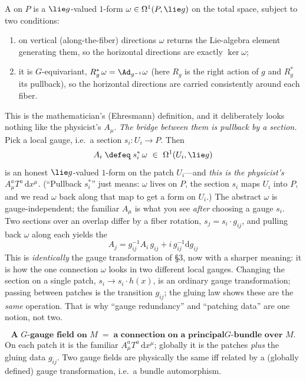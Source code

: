 \documentclass[11pt]{article}
\newcommand{\dd}{\mathrm{d}}                 %
\begin{document}
\begin{ddefinition}
A  on $P$ is a $\lie g$-valued $1$-form $\omega\in\Omega^1(P,\lie g)$ on
the total space, subject to two conditions:
\begin{enumerate}[label=(\roman*)]
\item on vertical (along-the-fiber) directions $\omega$ returns the Lie-algebra element
generating them, so the horizontal directions are exactly $\ker\omega$;
\item it is $G$-equivariant, $R_g^*\,\omega=\Ad_{g^{-1}}\omega$ (here $R_g$ is the right
action of $g$ and $R_g^*$ its pullback), so the horizontal directions are carried
consistently around each fiber.
\end{enumerate}
\end{ddefinition}

This is the mathematician's (Ehresmann) definition, and it deliberately looks nothing like
the physicist's $A_\mu$. \emph{The bridge between them is pullback by a section.} Pick a
local gauge, i.e.\ a section $s_i:U_i\to P$. Then
\[
A_i\;\defeq\;s_i^{*}\,\omega\ \in\ \Omega^1(U_i,\lie g)
\]
is an honest $\lie g$-valued $1$-form on the patch $U_i$---and \emph{this is the
physicist's $A_\mu^a T^a\,\dd x^\mu$.} (``Pullback $s_i^*$'' just means: $\omega$ lives on
$P$, the section $s_i$ maps $U_i$ into $P$, and we read $\omega$ back along that map to get
a form on $U_i$.) The abstract $\omega$ is gauge-independent; the familiar $A_\mu$ is what
you see \emph{after} choosing a gauge $s_i$. Two sections over an overlap differ by a
fiber rotation, $s_j=s_i\cdot g_{ij}$, and pulling back $\omega$ along each yields the
\[
\boxed{\;A_j=g_{ij}^{-1}A_i\,g_{ij}+i\,g_{ij}^{-1}\dd g_{ij}\;}
\]
This is \emph{identically} the gauge transformation of \S3, now with a sharper meaning: it
is how the one connection $\omega$ looks in two different local gauges. Changing the
section on a single patch, $s_i\to s_i\cdot h(x)$, is an ordinary gauge transformation;
passing between patches is the transition $g_{ij}$; the gluing law shows these are the
\emph{same} operation. That is why ``gauge redundancy'' and ``patching data'' are one
notion, not two.

\begin{eequation}
\[
\textbf{A $G$-gauge field on $M$} \;=\; \textbf{a connection on a principal
$G$-bundle over $M$.}
\]
On each patch it is the familiar $A_\mu^a T^a\,\dd x^\mu$; globally it is the patches
\emph{plus} the gluing data $g_{ij}$. Two gauge fields are physically the same iff
related by a (globally defined) gauge transformation, i.e.\ a bundle automorphism.
\end{eequation}
\end{document}
